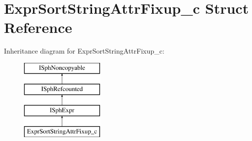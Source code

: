 \hypertarget{structExprSortStringAttrFixup__c}{\section{Expr\-Sort\-String\-Attr\-Fixup\-\_\-c Struct Reference}
\label{structExprSortStringAttrFixup__c}
}
Inheritance diagram for Expr\-Sort\-String\-Attr\-Fixup\-\_\-c\-:\begin{figure}[H]
\begin{center}
\leavevmode
\includegraphics[height=4.000000cm]{structExprSortStringAttrFixup__c}
\end{center}
\end{figure}
